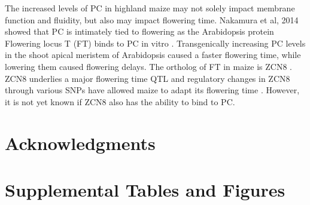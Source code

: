 \documentclass[9pt,twocolumn,twoside]{BioRxiv}
\begin{document}
The increased levels of PC in highland maize may not solely impact membrane function and fluidity, but also may impact flowering time. Nakamura et al, 2014 showed that PC is intimately tied to flowering as the Arabidopsis protein Flowering locus T (FT) binds to PC in vitro \cite{Nakamura2014-qf}.  Transgenically increasing PC levels in the shoot apical meristem of Arabidopsis caused a faster flowering time, while lowering them caused flowering delays. The ortholog of FT in maize is ZCN8 \cite{Lazakis2011-nq}. ZCN8 underlies a major flowering time QTL and regulatory changes in ZCN8 through various SNPs have allowed maize to adapt its flowering time \cite{Guo2019-pn}. However, it is not yet known if ZCN8 also has the ability to bind to PC.

\section{Acknowledgments}
\label{sec:acknowledgments}



\newpage  


\section*{Supplemental Tables and Figures}

\renewcommand{\thefigure}{S\arabic{figure}}
\renewcommand{\thetable}{S\arabic{table}}%
\linenumbers

\setcounter{figure}{0}
\setcounter{table}{0}
\end{document}
